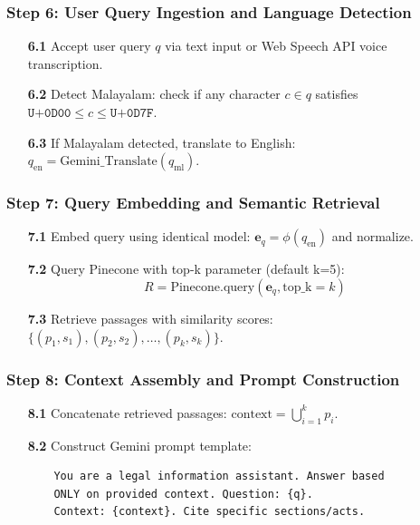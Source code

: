 \documentclass[12pt,a4paper]{report}
\begin{document}
\subsubsection*{Step 6: User Query Ingestion and Language Detection}
\begin{enumerate}
  \item[\textbf{6.1}] Accept user query $q$ via text input or Web Speech API voice transcription.
  \item[\textbf{6.2}] Detect Malayalam: check if any character $c \in q$ satisfies $\texttt{U+0D00} \le c \le \texttt{U+0D7F}$.
  \item[\textbf{6.3}] If Malayalam detected, translate to English: $q_{\text{en}} = \text{Gemini\_Translate}(q_{\text{ml}})$.
\end{enumerate}

\subsubsection*{Step 7: Query Embedding and Semantic Retrieval}
\begin{enumerate}
  \item[\textbf{7.1}] Embed query using identical model: $\mathbf{e}_q = \phi(q_{\text{en}})$ and normalize.
  \item[\textbf{7.2}] Query Pinecone with top-k parameter (default k=5):
    \begin{equation}
      R = \text{Pinecone.query}(\mathbf{e}_q, \text{top\_k}=k)
    \end{equation}
  \item[\textbf{7.3}] Retrieve passages with similarity scores: $\{(p_1, s_1), (p_2, s_2), \dots, (p_k, s_k)\}$.
\end{enumerate}

\subsubsection*{Step 8: Context Assembly and Prompt Construction}
\begin{enumerate}
  \item[\textbf{8.1}] Concatenate retrieved passages: $\text{context} = \bigcup_{i=1}^k p_i$.
  \item[\textbf{8.2}] Construct Gemini prompt template:
    \begin{verbatim}
    You are a legal information assistant. Answer based 
    ONLY on provided context. Question: {q}. 
    Context: {context}. Cite specific sections/acts.
    \end{verbatim}
\end{enumerate}
\end{document}
